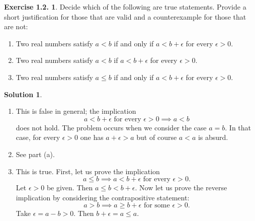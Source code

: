 \documentclass[12pt]{article}
\theoremstyle{definition}
\theoremstyle{exercise}
\newtheorem{exercise}{Exercise 1.2.}
\theoremstyle{solution}
\newtheorem*{solution}{Solution}
\begin{document}
\begin{exercise}
\label{ex:10}
    Decide which of the following are true statements. Provide a short justification for those that are valid and a counterexample for those that are not:
    \begin{enumerate}[label = (\alph*)]
        \item Two real numbers satisfy \( a < b \) if and only if \( a < b + \epsilon \) for every \( \epsilon > 0 \).

        \item Two real numbers satisfy \( a < b \) if \( a < b + \epsilon \) for every \( \epsilon > 0 \).

        \item Two real numbers satisfy \( a \leq b \) if and only if \( a < b + \epsilon \) for every \( \epsilon > 0 \).
    \end{enumerate}
\end{exercise}

\begin{solution}
    \begin{enumerate}[label = (\alph*)]
        \item This is false in general; the implication
        \[
            a < b + \epsilon \text{ for every } \epsilon > 0 \implies a < b
        \]
        does not hold. The problem occurs when we consider the case \( a = b \). In that case, for every \( \epsilon > 0 \) one has \( a + \epsilon > a \) but of course \( a < a \) is absurd.

        \item See part (a).

        \item This is true. First, let us prove the implication
        \[
            a \leq b \implies a < b + \epsilon \text{ for every } \epsilon > 0.
        \]
        Let \( \epsilon > 0 \) be given. Then \( a \leq b < b + \epsilon \). Now let us prove the reverse implication by considering the contrapositive statement:
        \[
            a > b \implies a \geq b + \epsilon \text{ for some } \epsilon > 0.
        \]
        Take \( \epsilon = a - b > 0 \). Then \( b + \epsilon = a \leq a \).
    \end{enumerate}
\end{solution}
\end{document}
